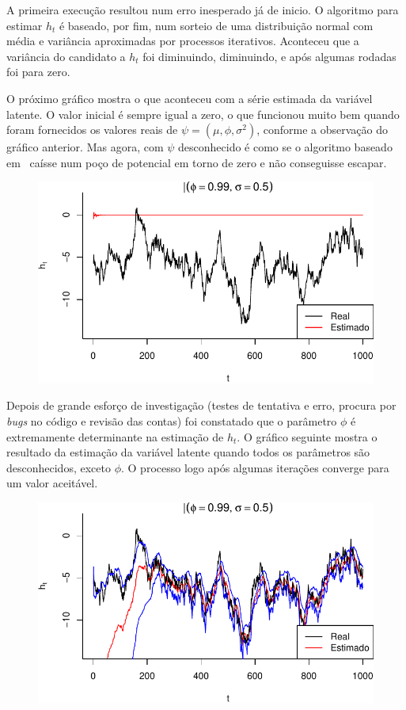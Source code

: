 \documentclass[12pt, a4paper]{article}
\begin{document}
A primeira execução resultou num erro inesperado já de inicio. O algoritmo para estimar $h_t$ é baseado, por fim, num sorteio de uma distribuição normal com média e variância aproximadas por processos iterativos. Aconteceu que a variância do candidato a $h_t$ foi diminuindo, diminuindo, e após algumas rodadas foi para zero.

O próximo gráfico mostra o que aconteceu com a série estimada da variável latente. O valor inicial é sempre igual a zero, o que funcionou muito bem quando foram fornecidos os valores reais de $\psi = (\mu, \phi, \sigma^2)$, conforme a observação do gráfico anterior. Mas agora, com $\psi$ desconhecido é como se o algoritmo baseado em \mccormick\ caísse num poço de potencial em torno de zero e não conseguisse escapar.

\begin{figure}[ht]
  \centering
  \includegraphics{img/p099s05_1}
\end{figure}

Depois de grande esforço de investigação (testes de tentativa e erro, procura por \textit{bugs} no código e revisão das contas) foi constatado que o parâmetro $\phi$ é extremamente determinante na estimação de $h_t$. O gráfico seguinte mostra o resultado da estimação da variável latente quando todos os parâmetros são desconhecidos, exceto $\phi$. O processo logo após algumas iterações converge para um valor aceitável.

\begin{figure}[ht]
  \centering
  \includegraphics{img/p099s05_2}
\end{figure}
\end{document}
